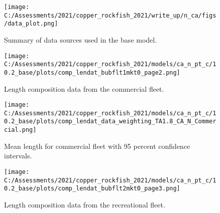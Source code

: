 \documentclass[11pt,
  english,
  a4paper,
]{article}
\begin{document}

\begin{figure}
\centering
\texttt{[image: C:/Assessments/2021/copper\_rockfish\_2021/write\_up/n\_ca/figs/data\_plot.png]}
\caption{Summary of data sources used in the base model.\label{fig:data-plot}}
\end{figure}

\tagmcend\tagstructend


\begin{figure}
\centering
\texttt{[image: C:/Assessments/2021/copper\_rockfish\_2021/models/ca\_n\_pt\_c/10.2\_base/plots/comp\_lendat\_bubflt1mkt0\_page2.png]}
\caption{Length composition data from the commercial fleet.\label{fig:com-len-data}}
\end{figure}

\tagmcend\tagstructend


\begin{figure}
\centering
\texttt{[image: C:/Assessments/2021/copper\_rockfish\_2021/models/ca\_n\_pt\_c/10.2\_base/plots/comp\_lendat\_data\_weighting\_TA1.8\_CA\_N\_Commercial.png]}
\caption{Mean length for commercial fleet with 95 percent confidence intervals.\label{fig:mean-com-len-data}}
\end{figure}

\tagmcend\tagstructend


\begin{figure}
\centering
\texttt{[image: C:/Assessments/2021/copper\_rockfish\_2021/models/ca\_n\_pt\_c/10.2\_base/plots/comp\_lendat\_bubflt2mkt0\_page3.png]}
\caption{Length composition data from the recreational fleet.\label{fig:rec-len-data}}
\end{figure}

\tagmcend\tagstructend

\end{document}
